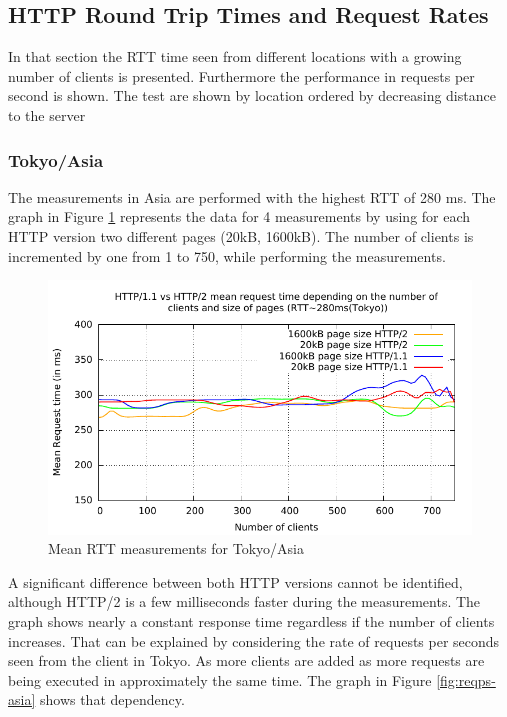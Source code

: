 \subsection{HTTP Round Trip Times and Request Rates}
\label{subsec:rtt}

In that section the RTT time seen from different locations with a growing number of clients is presented. Furthermore the performance in requests per second is shown. The test are shown by location ordered by decreasing distance to the server

\subsubsection{Tokyo/Asia}

The measurements in Asia are performed with the highest RTT of 280 ms. The graph in Figure \ref{fig:latency-asia}  represents the data for 4 measurements by using for each HTTP version two different pages (20kB, 1600kB). The number of clients is incremented by one  from 1 to 750, while performing the measurements.

\begin{figure}[H]
	\centering
	\includegraphics[scale=1,trim=0.0cm .0cm .0cm .0cm,clip]{images/latency-asia.pdf}
	\caption{Mean RTT measurements for Tokyo/Asia}
	\label{fig:latency-asia}
\end{figure}

A significant difference between both HTTP versions cannot be identified, although HTTP/2 is a few milliseconds faster during the measurements. The graph shows nearly a constant response time regardless if the number of clients increases. That can be explained by considering the rate of requests per seconds seen from the client in Tokyo. As more clients are added as more requests are being executed in approximately the same time. The graph in Figure \ref{fig:reqps-asia} shows that dependency.

